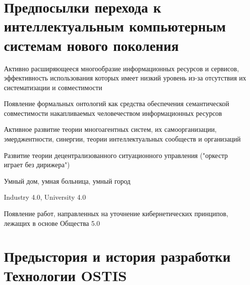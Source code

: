 \section*{Предпосылки перехода к интеллектуальным компьютерным системам нового поколения}
\label{concl_transition_background}

\begin{textitemize}
\item Активно расширяющееся многообразие информационных ресурсов и сервисов, эффективность использования которых имеет низкий уровень из-за отсутствия их систематизации и совместимости 
\item Появление формальных онтологий как средства обеспечения семантической совместимости накапливаемых человечеством информационных ресурсов
\item Активное развитие теории многоагентных систем, их самоорганизации, эмерджентности, синергии, теории интеллектуальных сообществ и организаций
\item Развитие теории децентрализованного ситуационного управления ("оркестр играет без дирижера"{})
\item Умный дом, умная больница, умный город
\item Industry 4.0, University 4.0
\item Появление работ, направленных на уточнение кибернетических принципов, лежащих в основе Общества 5.0
\end{textitemize}

\section*{Предыстория и история разработки Технологии OSTIS}
\label{concl_ostis_history}

